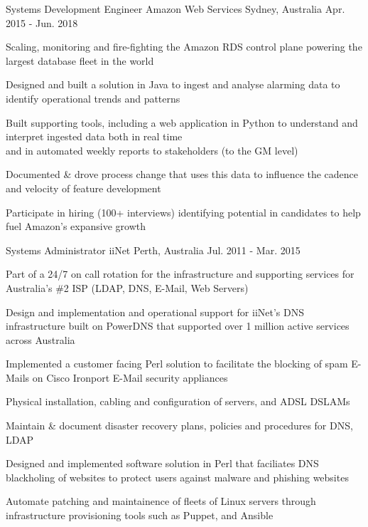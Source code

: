 \begin{cventries}
  \cventry
    {Systems Development Engineer} %
    {Amazon Web Services} %
    {Sydney, Australia} %
    {Apr. 2015 - Jun. 2018} %
    {
      \begin{cvitems} %
        \item {Scaling, monitoring and fire-fighting the Amazon RDS control plane powering the largest database fleet in the world}
        \item {Designed and built a solution in Java to ingest and analyse alarming data to identify operational trends and patterns }
        \item {Built supporting tools, including a web application in Python to understand and interpret ingested data both in real time\\
        and in automated weekly reports to stakeholders (to the GM level)}
        \item {Documented \& drove process change that uses this data to influence the cadence and velocity of feature development }
        \item {Participate in hiring (100+ interviews) identifying potential in candidates to help fuel Amazon's expansive growth}
      \end{cvitems}
    }

  \cventry
    {Systems Administrator} %
    {iiNet} %
    {Perth, Australia} %
    {Jul. 2011 - Mar. 2015} %
    {
      \begin{cvitems} %
        \item {Part of a 24/7 on call rotation for the infrastructure and supporting services for Australia's \#2 ISP (LDAP, DNS, E-Mail, Web Servers)}
        \item {Design and implementation and operational support for iiNet's DNS infrastructure built on PowerDNS that supported over 1 million active services across Australia}
        \item {Implemented a customer facing Perl solution to facilitate the blocking of spam E-Mails on Cisco Ironport E-Mail security appliances}
        \item {Physical installation, cabling and configuration of servers, and ADSL DSLAMs}
        \item {Maintain \& document disaster recovery plans, policies and procedures for DNS, LDAP}
        \item {Designed and implemented software solution in Perl that faciliates DNS blackholing of websites to protect users against malware and phishing websites}
        \item {Automate patching and maintainence of fleets of Linux servers through infrastructure provisioning tools such as Puppet, and Ansible}
      \end{cvitems}
    }
\end{cventries}

